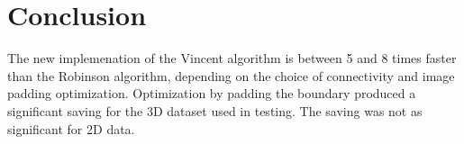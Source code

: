 \documentclass{InsightArticle}
\begin{document}
\section{Conclusion}
The new implemenation of the Vincent algorithm is between 5 and 8
times faster than the Robinson algorithm, depending on the choice of
connectivity and image padding optimization. Optimization by padding
the boundary produced a significant saving for the 3D dataset used in
testing. The saving was not as significant for 2D data.




%

\end{document}
